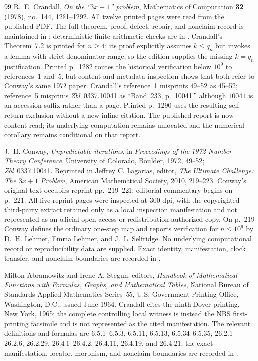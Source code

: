 \begin{thebibliography}{99}
R.~E. Crandall,
\emph{On the ``$3x+1$'' problem},
Mathematics of Computation \textbf{32} (1978), no.~144, 1281--1292.  All
twelve printed pages were read from the published PDF.  The full theorem,
proof, defect, repair, and nonclaim record is maintained in
; deterministic finite
arithmetic checks are in .
Crandall's Theorem~7.2 is printed for $n\geq4$; its proof explicitly assumes
$k\leq q_n$ but invokes a lemma with strict denominator range, so the edition
  supplies the missing $k=q_n$ justification.  Printed p.~1282 routes the
  historical verification below $10^9$ to references~1 and~5, but content
  and metadata inspection shows that both refer to Conway's same 1972 paper.
  Crandall's reference~1 misprints 49--52 as 45--52; reference~5 misprints
  \emph{Zbl}~0337.10041 as ``Band~233, p.~10041,'' although $10041$ is an
  accession suffix rather than a page.  Printed p.~1290 uses the resulting
  self-return exclusion without a new inline citation.  The published report
  is now content-read; its underlying computation remains unlocated and the
  numerical corollary remains conditional on that report.

J.~H. Conway,
\emph{Unpredictable iterations},
in \emph{Proceedings of the 1972 Number Theory Conference}, University of
Colorado, Boulder, 1972, 49--52; \emph{Zbl}~0337.10041.  Reprinted in
Jeffrey C. Lagarias, editor, \emph{The Ultimate Challenge: The $3x+1$
Problem}, American Mathematical Society, 2010, 219--223.  Conway's original
text occupies reprint pp.~219--221; editorial commentary begins on p.~221.
All five reprint pages were inspected at 300 dpi, with the copyrighted
third-party extract retained only as a local inspection manifestation and
not represented as an official open-access or redistribution-authorized
copy.  On p.~219 Conway defines the ordinary one-step map and reports
verification for $n\leq10^9$ by D.~H. Lehmer, Emma Lehmer, and
J.~L. Selfridge.  No underlying computational record or reproducibility data
are supplied.  Exact identity, manifestation, clock transfer, and nonclaim
boundaries are recorded in
.

Milton Abramowitz and Irene A. Stegun, editors,
\emph{Handbook of Mathematical Functions with Formulas, Graphs, and
Mathematical Tables},
National Bureau of Standards Applied Mathematics Series~55, U.S. Government
Printing Office, Washington, D.C., issued June 1964.  Crandall cites the
ninth Dover printing, New York, 1965; the complete controlling local witness
is instead the NBS first-printing facsimile and is not represented as the
cited manifestation.  The relevant definitions and formulas are
6.5.1--6.5.3, 6.5.11, 6.5.13, 6.5.34--6.5.35, 26.2.1--26.2.6, 26.2.29,
26.4.1--26.4.2, 26.4.11, 26.4.19, and 26.4.21; the exact manifestation,
locator, morphism, and nonclaim boundaries are recorded in
.


\end{thebibliography}
